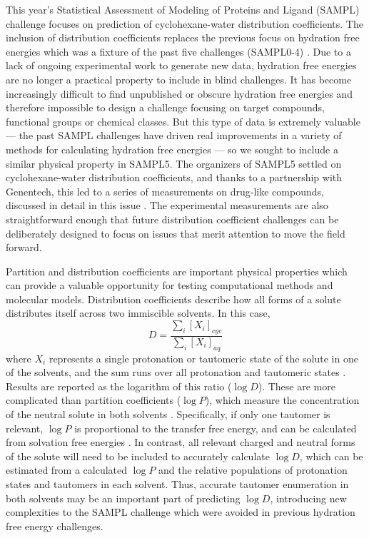 This year's Statistical Assessment of Modeling of Proteins and Ligand (SAMPL) challenge focuses on prediction of cyclohexane-water distribution coefficients. 
The inclusion of distribution coefficients replaces the previous focus on hydration free energies which was a fixture of the past five challenges (SAMPL0-4)  \cite{Mobley:2014gu,Geballe:2012fc,Geballe:2010jr,Klimovich:2010jm,Mobley:2009iu,Mobley:2012jwa,Nicholls:2008cx}.
Due to a lack of ongoing experimental work to generate new data, hydration free energies are no longer a practical property to include in blind challenges. 
It has become increasingly difficult to find unpublished or obscure hydration free energies and therefore impossible to design a challenge focusing on target compounds, functional groups or chemical classes. 
But this type of data is extremely valuable --- the past SAMPL challenges have driven real improvements in a variety of methods for calculating hydration free energies  \cite{Mobley:2014gu} --- so we sought to include a similar physical property in SAMPL5. 
The organizers of SAMPL5 settled on cyclohexane-water distribution coefficients, and thanks to a partnership with Genentech, this led to a series of measurements on drug-like compounds, discussed in detail in this issue  \cite{Rustenburg:sampl5}.
The experimental measurements are also straightforward enough that future distribution coefficient challenges can be deliberately designed to focus on issues that merit attention to move the field forward.

Partition and distribution coefficients are important physical properties  \cite{Leo:1971wu,Young:2011gs} which can provide a valuable opportunity for testing computational methods and molecular models. 
Distribution coefficients describe how all forms of a solute distributes itself across two immiscible solvents. 
In this case,
\begin{equation}
D = \frac{\sum_i [X_i]_{cyc}}{\sum_i [X_i]_{aq}}
\label{deflogD}
\end{equation}
where $X_i$ represents a single protonation or tautomeric state of the solute in one of the solvents, and the sum runs over all protonation and tautomeric states  \cite{Young:2011gs}. 
Results are reported as the logarithm of this ratio ($\log D$). 
These are more complicated than partition coefficients ($\log P$), which measure the concentration of the neutral solute in both solvents  \cite{Leo:1971wu}.
Specifically, if only one tautomer is relevant, $\log P$ is proportional to the transfer free energy, and can be calculated from solvation free energies  \cite{Essex:1992bd,Best:1999ix,JohnEEksterowicz:1997cj,Jorgensen:1989ga,Jorgensen:1990ha,Garrido:2009hz,Garrido:2011es,Garrido:2012gc,Yang:2013io,Michel:2007gw,Genheden:2016jj}. 
In contrast, all relevant charged and neutral forms of the solute will need to be included to accurately calculate $\log D$, which can be estimated from a calculated $\log P$ and the relative populations of protonation states and tautomers in each solvent. 
Thus, accurate tautomer enumeration in both solvents may be an important part of predicting $\log D$, introducing new complexities to the SAMPL challenge which were avoided in previous hydration free energy challenges.

